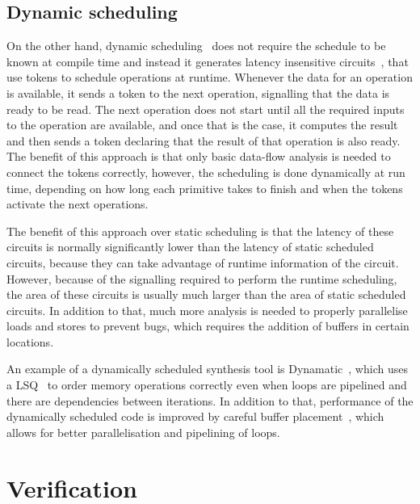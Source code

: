 \subsection{Dynamic scheduling}%
\label{sec:bg:dynamic-scheduling}

On the other hand, \gls{dynamic
  scheduling}~\cite{josipović18_dynam_sched_high_synth} does not require the
schedule to be known at compile time and instead it generates latency
insensitive circuits~\cite{carloni01_tlid}, that use tokens to schedule
operations at runtime.  Whenever the data for an operation is available, it
sends a token to the next operation, signalling that the data is ready to be
read.  The next operation does not start until all the required inputs to the
operation are available, and once that is the case, it computes the result and
then sends a token declaring that the result of that operation is also ready.
The benefit of this approach is that only basic data-flow analysis is needed to
connect the tokens correctly, however, the scheduling is done dynamically at run
time, depending on how long each primitive takes to finish and when the tokens
activate the next operations.

The benefit of this approach over static scheduling is that the latency of these
circuits is normally significantly lower than the latency of static scheduled
circuits, because they can take advantage of runtime information of the circuit.
However, because of the signalling required to perform the runtime scheduling,
the area of these circuits is usually much larger than the area of static
scheduled circuits.  In addition to that, much more analysis is needed to
properly parallelise loads and stores to prevent bugs, which requires the
addition of buffers in certain locations.

An example of a dynamically scheduled synthesis tool is
Dynamatic~\cite{josipović18_dynam_sched_high_synth}, which uses a
\gls{LSQ}~\cite{josipović17_out_order_load_store_queue_spatial_comput} to order
memory operations correctly even when loops are pipelined and there are
dependencies between iterations.  In addition to that, performance of the
dynamically scheduled code is improved by careful buffer
placement~\cite{josipović21_buffer_placem_sizin_high_perfor_dataf_circuit},
which allows for better parallelisation and pipelining of loops.

\section{Verification}%
\label{sec:bg:verification}

